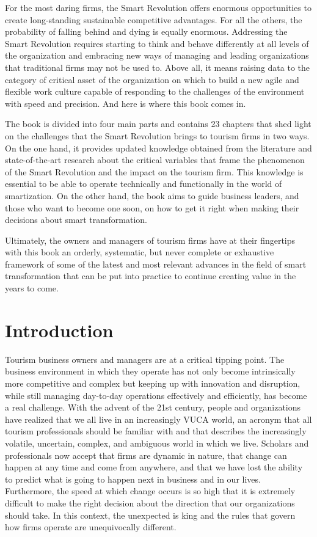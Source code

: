 \documentclass[
  letterpaper,
  DIV=11,
  numbers=noendperiod]{scrreprt}
\begin{document}
For the most daring firms, the Smart Revolution offers enormous
opportunities to create long-standing sustainable competitive
advantages. For all the others, the probability of falling behind and
dying is equally enormous. Addressing the Smart Revolution requires
starting to think and behave differently at all levels of the
organization and embracing new ways of managing and leading
organizations that traditional firms may not be used to. Above all, it
means raising data to the category of critical asset of the organization
on which to build a new agile and flexible work culture capable of
responding to the challenges of the environment with speed and
precision. And here is where this book comes in.

The book is divided into four main parts and contains 23 chapters that
shed light on the challenges that the Smart Revolution brings to tourism
firms in two ways. On the one hand, it provides updated knowledge
obtained from the literature and state-of-the-art research about the
critical variables that frame the phenomenon of the Smart Revolution and
the impact on the tourism firm. This knowledge is essential to be able
to operate technically and functionally in the world of smartization. On
the other hand, the book aims to guide business leaders, and those who
want to become one soon, on how to get it right when making their
decisions about smart transformation.

Ultimately, the owners and managers of tourism firms have at their
fingertips with this book an orderly, systematic, but never complete or
exhaustive framework of some of the latest and most relevant advances in
the field of smart transformation that can be put into practice to
continue creating value in the years to come.

\part{Introduction}

Tourism business owners and managers are at a critical tipping point.
The business environment in which they operate has not only become
intrinsically more competitive and complex but keeping up with
innovation and disruption, while still managing day-to-day operations
effectively and efficiently, has become a real challenge. With the
advent of the 21st century, people and organizations have realized that
we all live in an increasingly VUCA world, an acronym that all tourism
professionals should be familiar with and that describes the
increasingly volatile, uncertain, complex, and ambiguous world in which
we live. Scholars and professionals now accept that firms are dynamic in
nature, that change can happen at any time and come from anywhere, and
that we have lost the ability to predict what is going to happen next in
business and in our lives. Furthermore, the speed at which change occurs
is so high that it is extremely difficult to make the right decision
about the direction that our organizations should take. In this context,
the unexpected is king and the rules that govern how firms operate are
unequivocally different.
\end{document}
